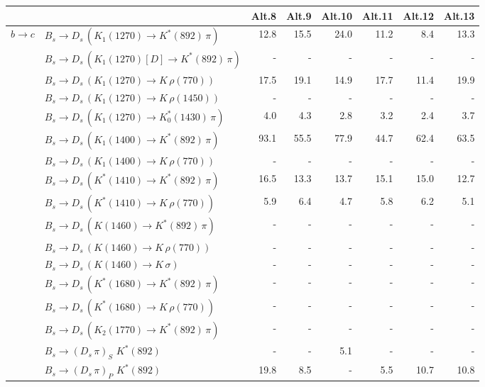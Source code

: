 \begin{tabular}{l l  r  r  r  r  r  r  } 
\hline
\hline
&  & \multicolumn{1}{c}{Alt.8}  & \multicolumn{1}{c}{Alt.9}  & \multicolumn{1}{c}{Alt.10}  & \multicolumn{1}{c}{Alt.11}  & \multicolumn{1}{c}{Alt.12}  & \multicolumn{1}{c}{Alt.13}  \\ 
\hline
\multirow{28}{*}{$b \to c$}  & $B_s \to D_s \, ( K_1(1270) \to K^{*}(892) \, \pi )$ & 12.8 & 15.5 & 24.0 & 11.2 & 8.4 & 13.3 \\ 
 & $B_s \to D_s \, ( K_1(1270)[D] \to K^{*}(892) \, \pi )$ & -  & -  & -  & -  & -  & -  \\ 
 & $B_s \to D_s \, ( K_1(1270) \to K \, \rho(770) )$ & 17.5 & 19.1 & 14.9 & 17.7 & 11.4 & 19.9 \\ 
 & $B_s \to D_s \, ( K_1(1270) \to K \, \rho(1450) )$ & -  & -  & -  & -  & -  & -  \\ 
 & $B_s \to D_s \, ( K_1(1270) \to K^{*}_{0}(1430) \, \pi )$ & 4.0 & 4.3 & 2.8 & 3.2 & 2.4 & 3.7 \\ 
 & $B_s \to D_s \, ( K_1(1400) \to K^{*}(892) \, \pi )$ & 93.1 & 55.5 & 77.9 & 44.7 & 62.4 & 63.5 \\ 
 & $B_s \to D_s \, ( K_1(1400) \to K \, \rho(770) )$ & -  & -  & -  & -  & -  & -  \\ 
 & $B_s \to D_s \, ( K^{*}(1410) \to K^{*}(892) \, \pi )$ & 16.5 & 13.3 & 13.7 & 15.1 & 15.0 & 12.7 \\ 
 & $B_s \to D_s \, ( K^{*}(1410) \to K \, \rho(770) )$ & 5.9 & 6.4 & 4.7 & 5.8 & 6.2 & 5.1 \\ 
 & $B_s \to D_s \, ( K(1460) \to K^{*}(892) \, \pi )$ & -  & -  & -  & -  & -  & -  \\ 
 & $B_s \to D_s \, ( K(1460) \to K \, \rho(770) )$ & -  & -  & -  & -  & -  & -  \\ 
 & $B_s \to D_s \, ( K(1460) \to K \, \sigma )$ & -  & -  & -  & -  & -  & -  \\ 
 & $B_s \to D_s \, ( K^{*}(1680) \to K^{*}(892) \, \pi )$ & -  & -  & -  & -  & -  & -  \\ 
 & $B_s \to D_s \, ( K^{*}(1680) \to K \, \rho(770) )$ & -  & -  & -  & -  & -  & -  \\ 
 & $B_s \to D_s \, ( K_2(1770) \to K^{*}(892) \, \pi )$ & -  & -  & -  & -  & -  & -  \\ 
 & $B_s \to ( D_s \, \pi)_{S} \, \, K^{*}(892)$ & -  & -  & 5.1 & -  & -  & -  \\ 
 & $B_s \to ( D_s \, \pi)_{P} \, \, K^{*}(892)$ & 19.8 & 8.5 & -  & 5.5 & 10.7 & 10.8 \\ 

\end{tabular}
